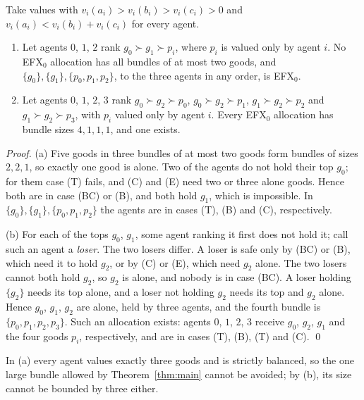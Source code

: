 \documentclass[runningheads,11pt]{llncs}
\newcommand{\efxz}{\texorpdfstring{\mbox{EFX$_0$}}{EFX0}}
\begin{document}
\begin{proposition}\label{prop:neg}
Take values with $v_i(a_i)>v_i(b_i)>v_i(c_i)>0$ and $v_i(a_i)<v_i(b_i)+v_i(c_i)$ for every agent.
\begin{enumerate}
\item[(a)] Let agents $0$, $1$, $2$ rank $g_0\succ g_1\succ p_i$, where $p_i$ is valued only by agent $i$. No \efxz{} allocation has all bundles of at most two goods, and $\{g_0\},\{g_1\},\{p_0,p_1,p_2\}$, to the three agents in any order, is \efxz{}.
\item[(b)] Let agents $0$, $1$, $2$, $3$ rank $g_0\succ g_2\succ p_0$, $g_0\succ g_2\succ p_1$, $g_1\succ g_2\succ p_2$ and $g_1\succ g_2\succ p_3$, with $p_i$ valued only by agent $i$. Every \efxz{} allocation has bundle sizes $4,1,1,1$, and one exists.
\end{enumerate}
\end{proposition}

\begin{proof}
(a) Five goods in three bundles of at most two goods form bundles of sizes $2,2,1$, so exactly one good is alone. Two of the agents do not hold their top $g_0$; for them case (T) fails, and (C) and (E) need two or three alone goods. Hence both are in case (BC) or (B), and both hold $g_1$, which is impossible. In $\{g_0\},\{g_1\},\{p_0,p_1,p_2\}$ the agents are in cases (T), (B) and (C), respectively.

(b) For each of the tops $g_0$, $g_1$, some agent ranking it first does not hold it; call such an agent a \emph{loser}. The two losers differ. A loser is safe only by (BC) or (B), which need it to hold $g_2$, or by (C) or (E), which need $g_2$ alone. The two losers cannot both hold $g_2$, so $g_2$ is alone, and nobody is in case (BC). A loser holding $\{g_2\}$ needs its top alone, and a loser not holding $g_2$ needs its top and $g_2$ alone. Hence $g_0$, $g_1$, $g_2$ are alone, held by three agents, and the fourth bundle is $\{p_0,p_1,p_2,p_3\}$. Such an allocation exists: agents $0$, $1$, $2$, $3$ receive $g_0$, $g_2$, $g_1$ and the four goods $p_i$, respectively, and are in cases (T), (B), (T) and (C). \qed
\end{proof}

\noindent In (a) every agent values exactly three goods and is strictly balanced, so the one large bundle allowed by Theorem~\ref{thm:main} cannot be avoided; by (b), its size cannot be bounded by three either.

\end{document}
